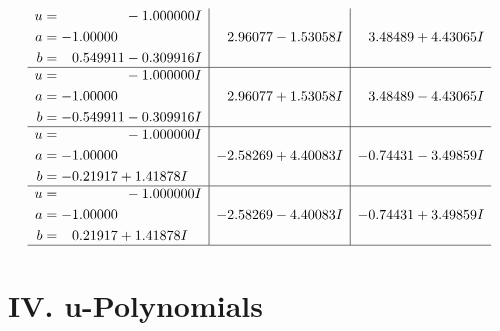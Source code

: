 \documentclass[1p]{elsarticle_modified}
\theoremstyle{definition}
\begin{document}
$$\begin{array}{c|c|c}
\begin{aligned}
u &= \phantom{-0.000000 } -1.000000 I \\
a &= -1.00000\phantom{ +0.000000I} \\
b &= \phantom{-}0.549911 - 0.309916 I\end{aligned}
 & \phantom{-}2.96077 - 1.53058 I & \phantom{-}3.48489 + 4.43065 I \\ \hline\begin{aligned}
u &= \phantom{-0.000000 } -1.000000 I \\
a &= -1.00000\phantom{ +0.000000I} \\
b &= -0.549911 - 0.309916 I\end{aligned}
 & \phantom{-}2.96077 + 1.53058 I & \phantom{-}3.48489 - 4.43065 I \\ \hline\begin{aligned}
u &= \phantom{-0.000000 } -1.000000 I \\
a &= -1.00000\phantom{ +0.000000I} \\
b &= -0.21917 + 1.41878 I\end{aligned}
 & -2.58269 + 4.40083 I & -0.74431 - 3.49859 I \\ \hline\begin{aligned}
u &= \phantom{-0.000000 } -1.000000 I \\
a &= -1.00000\phantom{ +0.000000I} \\
b &= \phantom{-}0.21917 + 1.41878 I\end{aligned}
 & -2.58269 - 4.40083 I & -0.74431 + 3.49859 I\\
 \hline 
 \end{array}$$\newpage
\newpage\renewcommand{\arraystretch}{1}
\centering \section*{ IV. u-Polynomials}
\end{document}
